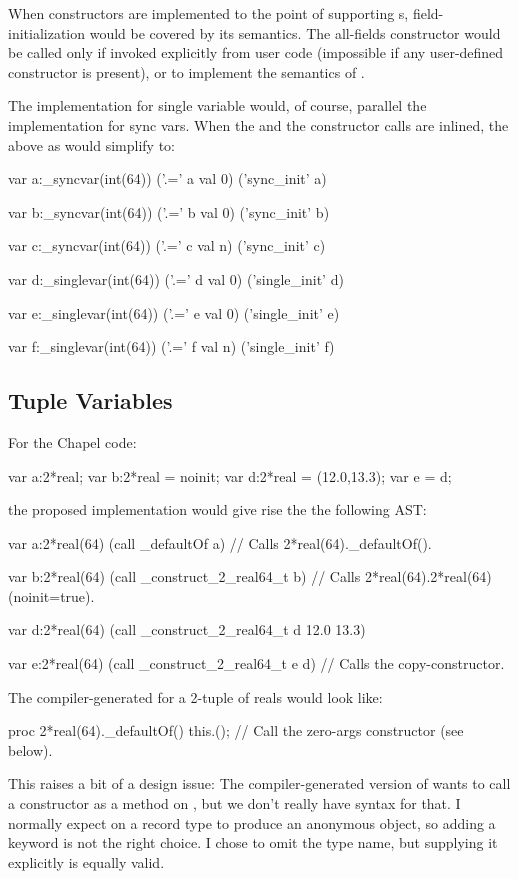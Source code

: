 When constructors are implemented to the point of supporting
s, field-initialization would be covered by its
semantics.  The all-fields constructor would be called only if invoked
explicitly from user code (impossible if any user-defined constructor is
present), or to implement the semantics of .

The implementation for single variable would, of course, parallel the implementation for
sync vars.  When the  and the constructor calls are inlined, the above as would
simplify to:
\begin{numberedchapel}
  var a:_syncvar(int(64))
  ('.=' a val 0)
  ('sync_init' a)

  var b:_syncvar(int(64))
  ('.=' b val 0)
  ('sync_init' b)

  var c:_syncvar(int(64))
  ('.=' c val n)
  ('sync_init' c)

  var d:_singlevar(int(64))
  ('.=' d val 0)
  ('single_init' d)

  var e:_singlevar(int(64))
  ('.=' e val 0)
  ('single_init' e)

  var f:_singlevar(int(64))
  ('.=' f val n)
  ('single_init' f)
\end{numberedchapel}


\subsection{Tuple Variables}

For the Chapel code:
\begin{chapel}
  var a:2*real;
  var b:2*real = noinit;
  var d:2*real = (12.0,13.3);
  var e = d;
\end{chapel}
\noindent
the proposed implementation would give rise the the following AST:
\begin{numberedchapel}
  var a:2*real(64)
  (call _defaultOf a) // Calls 2*real(64)._defaultOf().

  var b:2*real(64)
  (call _construct_2_real64_t b) // Calls 2*real(64).2*real(64)(noinit=true).

  var d:2*real(64)
  (call _construct_2_real64_t d 12.0 13.3)

  var e:2*real(64)
  (call _construct_2_real64_t e d) // Calls the copy-constructor.
\end{numberedchapel}
The compiler-generated  for a 2-tuple of reals would look like:
\begin{chapel}
  proc 2*real(64)._defaultOf() {
    this.(); // Call the zero-args constructor (see below).
  }
\end{chapel}
\noindent
This raises a bit of a design issue: The compiler-generated version of 
wants to call a constructor as a method on , but we don't really have syntax
for that.  I normally expect  on a record type to produce an
anonymous object, so adding a  keyword is not the right choice.  I chose to
omit the type name, but supplying it explicitly is equally valid.  

